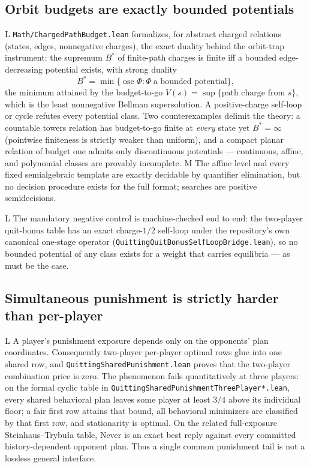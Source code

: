 \documentclass[11pt]{article}
\newcommand{\LTag}{\textsf{L}}
\newcommand{\MTag}{\textsf{M}}
\newcommand{\Prod}{\LTag}
\newcommand{\Audit}{\MTag}
\newcommand{\Status}[1]{#1}
\begin{document}
\subsection{Orbit budgets are exactly bounded potentials}

\Status{\Prod} \texttt{Math/ChargedPathBudget.lean} formalizes, for abstract
charged relations (states, edges, nonnegative charges), the exact duality
behind the orbit-trap instrument: the supremum \(B^*\) of finite-path
charges is finite iff a bounded edge-decreasing potential exists, with
strong duality
\[
 B^*=\min\{\operatorname{osc}\Phi:\Phi\ \text{a bounded potential}\},
\tag{30}
\]
the minimum attained by the budget-to-go \(V(s)=\sup\{\text{path charge
from }s\}\), which is the least nonnegative Bellman supersolution.  A
positive-charge self-loop or cycle refutes every potential class.  Two
counterexamples delimit the theory: a countable towers relation has
budget-to-go finite at \emph{every} state yet \(B^*=\infty\) (pointwise
finiteness is strictly weaker than uniform), and a compact planar relation
of budget one admits only discontinuous potentials --- continuous,
affine, and polynomial classes are provably incomplete.  \Status{\Audit}
The affine level and every fixed semialgebraic template are exactly
decidable by quantifier elimination, but no decision procedure exists for
the full format; searches are positive semidecisions.

\Status{\Prod} The mandatory negative control is machine-checked end to
end: the two-player quit-bonus table has an exact charge-\(1/2\) self-loop
under the repository's own canonical one-stage operator
(\texttt{QuittingQuitBonusSelfLoopBridge.lean}), so no bounded potential of
any class exists for a weight that carries equilibria --- as must be the
case.

\subsection{Simultaneous punishment is strictly harder than per-player}

\Status{\Prod} A player's punishment exposure depends only on the opponents'
plan coordinates.  Consequently two-player per-player optimal rows glue into
one shared row, and \texttt{QuittingSharedPunishment.lean} proves that the
two-player combination price is zero.  The phenomenon fails quantitatively
at three players: on the formal cyclic table in
\texttt{QuittingSharedPunishmentThreePlayer*.lean}, every shared behavioral
plan leaves some player at least \(3/4\) above its individual floor; a fair
first row attains that bound, all behavioral minimizers are classified by that
first row, and stationarity is optimal.  On the related full-exposure
Steinhaus--Trybu{\l}a table, Never is an exact best reply against every committed
history-dependent opponent plan.  Thus a single common punishment tail is not
a lossless general interface.
\end{document}
